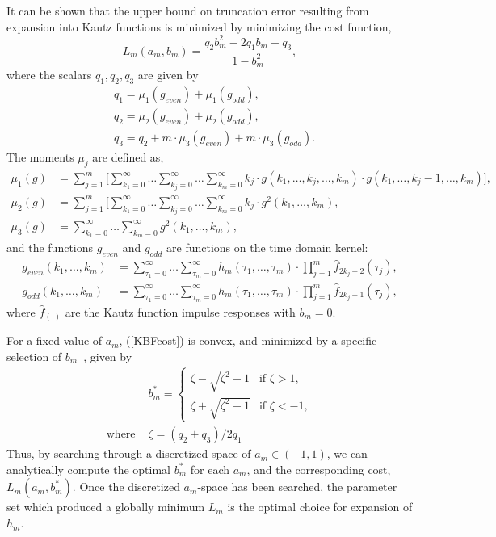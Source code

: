 It can be shown \cite{Rosa2007} that the upper bound on truncation error resulting from expansion into Kautz functions is minimized by minimizing the cost function,
\begin{equation}
\label{KBFcost}
L_m(a_m,b_m) = \frac{q_2 b_m^2 - 2 q_1 b_m + q_3}{1-b_m^2},
\end{equation}
where the scalars $q_1, q_2, q_3$ are given by
\begin{align*}
&q_1 = \mu_1(g_{even}) + \mu_1(g_{odd}),\\
&q_2 = \mu_2(g_{even}) + \mu_2(g_{odd}),\\
&q_3 = q_2 + m \cdot \mu_3(g_{even}) + m \cdot \mu_3(g_{odd}).
\end{align*}
The moments $\mu_j$ are defined as,
\begin{align*}
\mu_1(g) &= \sum_{j=1}^{m} \Bigg[  \sum_{k_1=0}^{\infty} \hdots \sum_{k_j=0}^{\infty} \hdots \sum_{k_m=0}^{\infty} k_j \cdot g(k_1,\hdots,k_j,\hdots,k_m) \cdot g(k_1,\hdots,k_j-1,\hdots,k_m) \Bigg], \\
\mu_2(g) &= \sum_{j=1}^{m} \Bigg[  \sum_{k_1=0}^{\infty} \hdots \sum_{k_j=0}^{\infty} \hdots \sum_{k_m=0}^{\infty} k_j \cdot g^2(k_1,\hdots,k_m),\\
\mu_3(g) &= \sum_{k_1=0}^{\infty} \hdots \sum_{k_m=0}^{\infty} g^2(k_1,\hdots,k_m),
\end{align*}
and the functions $g_{even}$ and $g_{odd}$ are functions on the time domain kernel:
\begin{align*}
g_{even}(k_1, \hdots, k_m) &= \sum_{\tau_1=0}^{\infty} \hdots \sum_{\tau_m=0}^{\infty} h_m(\tau_1, \hdots, \tau_m) \cdot \prod_{j=1}^{m} \hat{f}_{2k_j+2}(\tau_j),\\
g_{odd}(k_1, \hdots, k_m) &= \sum_{\tau_1=0}^{\infty} \hdots \sum_{\tau_m=0}^{\infty} h_m(\tau_1, \hdots, \tau_m) \cdot \prod_{j=1}^{m} \hat{f}_{2k_j+1}(\tau_j),
\end{align*}
where $\hat{f}_{(\cdot)}$ are the Kautz function impulse responses with $b_m=0$. 

For a fixed value of $a_m$, (\ref{KBFcost}) is convex, and minimized by a specific selection of $b_m$~\cite{Rosa2007}, given by 
\begin{align*}
&b_m^* = 
\begin{cases}
\zeta - \sqrt{\zeta^2-1} &\text{if } \zeta>1, \\
\zeta + \sqrt{\zeta^2-1} &\text{if } \zeta<-1,
\end{cases} \\
\text{where } & \zeta = (q_2 + q_3)/2q_1
\end{align*}
Thus, by searching through a discretized space of $a_m \in (-1,1)$, we can analytically compute the optimal $b_m^*$ for each $a_m$, and the corresponding cost, $L_m(a_m,b_m^*)$. Once the discretized $a_m$-space has been searched, the parameter set which produced a globally minimum $L_m$ is the optimal choice for expansion of $h_m$. 

